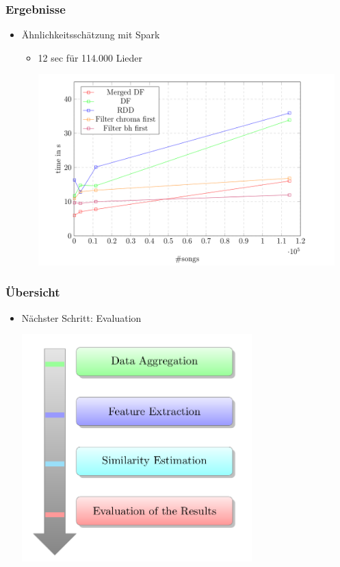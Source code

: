 \documentclass[12pt]{FSUBeamer_official}
\begin{document}
\begin{frame}
	\frametitle{Ergebnisse}
	\begin{itemize}
		\item Ähnlichkeitsschätzung mit Spark
		\begin{itemize}
			\item 12 sec für 114.000 Lieder
			\begin{minipage}[b]{0.85\linewidth}
				\centering
				\includegraphics[width=0.95\textwidth]{pics/SparkFeat/simp.png}	
			\end{minipage}
		\end{itemize}
	\end{itemize}
\end{frame}

\begin{frame}
	\frametitle{Übersicht}
	\begin{itemize}
		\item Nächster Schritt: Evaluation\\
		\begin{minipage}[b]{0.85\linewidth}
			\centering
			\includegraphics[width=0.7\textwidth]{pics/Org/Tasks.png}	
		\end{minipage}
	\end{itemize}
\end{frame}
\end{document}
